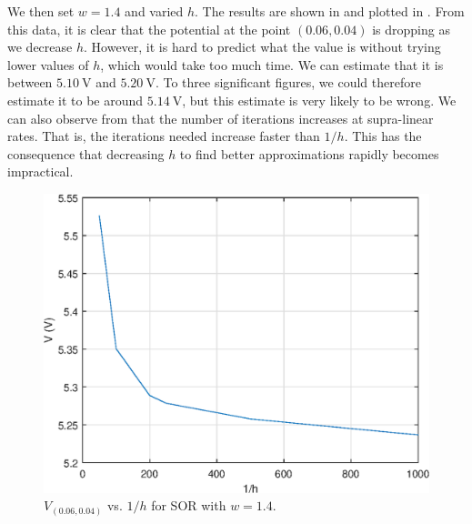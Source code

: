 \documentclass[journal,hidelinks]{IEEEtran}
\begin{document}
We then set $w = 1.4$ and varied $h$. The results are shown in  and plotted in . From this data, it is clear that the potential at the point $(0.06, 0.04)$ is dropping as we decrease $h$. However, it is hard to predict what the value is without trying lower values of $h$, which would take too much time. We can estimate that it is between $\SI{5.10}{\volt}$ and $\SI{5.20}{\volt}$. To three significant figures, we could therefore estimate it to be around $\SI{5.14}{\volt}$, but this estimate is very likely to be wrong. We can also observe from  that the number of iterations increases at supra-linear rates. That is, the iterations needed increase faster than $1/h$. This has the consequence that decreasing $h$ to find better approximations rapidly becomes impractical.

\begin{table}[!htb]
  \centering
  \caption{Results for SOR with $w = 1.4$ for different values of $h$.}
  \label{tab:q3-h-sor}
\end{table}

\begin{figure}[!htb]
  \centering
  \includegraphics[width=0.6\columnwidth]{question-3/h_v_sor.eps}
  \caption{$V_{(0.06,0.04)}$ vs. $1/h$ for SOR with $w = 1.4$.}
  \label{fig:q3-h-v-sor}
\end{figure}
\end{document}

